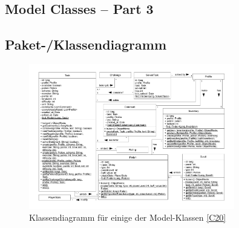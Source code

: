 \newpage
\subsection{Model Classes -- Part 3}
\subsection{Paket-/Klassendiagramm}
\begin{figure}[h!]
\centering
\includegraphics[width=0.8\textwidth]{figures/KDTaskAndInventory}
\caption{Klassendiagramm für einige der Model-Klassen \ref{C20}}
\label{classC10}
\end{figure}
\clearpage
